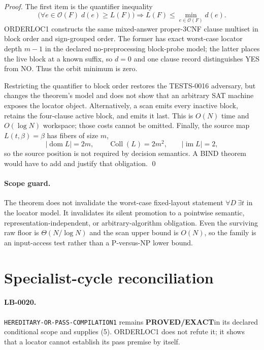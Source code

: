 \documentclass[11pt]{article}
\newcommand{\EXACT}{\textbf{PROVED/EXACT}}
\begin{document}
\begin{proof}
The first item is the quantifier inequality
\[
 \bigl(\forall e\in\mathcal O(F)\;d(e)\ge L(F)\bigr)
 \Longrightarrow L(F)\le\min_{e\in\mathcal O(F)}d(e).
\]
ORDERLOC1 constructs the same mixed-answer proper-$3$CNF clause multiset in
block order and sign-grouped order.  The former has exact worst-case locator
depth $m-1$ in the declared no-preprocessing block-probe model; the latter
places the live block at a known suffix, so $d=0$ and one clause record
distinguishes YES from NO.  Thus the orbit minimum is zero.

Restricting the quantifier to block order restores the TESTS-0016 adversary,
but changes the theorem's model and does not show that an arbitrary SAT
machine exposes the locator object.  Alternatively, a scan emits every
inactive block, retains the four-clause active block, and emits it last.  This
is $O(N)$ time and $O(\log N)$ workspace; those costs cannot be omitted.
Finally, the source map $L(t,\beta)=\beta$ has fibers of size $m$,
\[
 |\operatorname{dom}L|=2m,
 \qquad \operatorname{Coll}(L)=2m^2,
 \qquad |\operatorname{im}L|=2,
\]
so the source position is not required by decision semantics.  A BIND theorem
would have to add and justify that obligation. \qed
\end{proof}

\paragraph{Scope guard.}
The theorem does not invalidate the worst-case fixed-layout statement
$\forall D\ \exists t$ in the locator model.  It invalidates its silent
promotion to a pointwise semantic, representation-independent, or
arbitrary-algorithm obligation.  Even the surviving raw floor is
$\Theta(N/\log N)$ and the scan upper bound is $O(N)$, so the family is an
input-access test rather than a P-versus-NP lower bound.

\section{Specialist-cycle reconciliation}

\paragraph{LB-0020.}
\texttt{HEREDITARY-OR-PASS-COMPILATION1} remains \EXACT in its declared
conditional scope and supplies (5).  ORDERLOC1 does not refute it; it shows
that a locator cannot establish its pass premise by itself.
\end{document}
